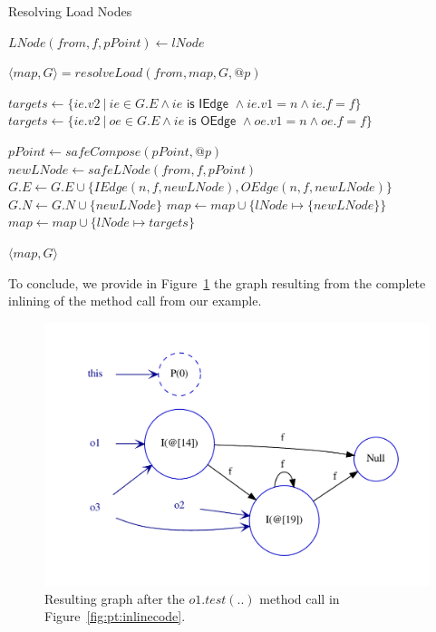 \begin{algorithm}
\caption{Resolving Load Nodes}\label{algo:pt:resload}
\begin{algorithmic}[1]

    \State $LNode(from, f, pPoint) \gets lNode$

        \State $\langle map, G \rangle = resolveLoad(from, map, G, @p)$
    \EndIf

        \State $targets \gets \{ ie.v2 ~|~ ie \in G.E \land ie \textsf{ is IEdge } \land ie.v1 = n \land ie.f = f \}$
            \State $targets \gets \{ ie.v2 ~|~ oe \in G.E \land ie \textsf{ is OEdge } \land oe.v1 = n \land oe.f = f \}$
        \EndIf

            \State $pPoint \gets safeCompose(pPoint, @p)$
            \State $newLNode \gets safeLNode(from, f, pPoint)$
            \State $G.E \gets G.E \cup \{ IEdge(n, f, newLNode), OEdge(n, f, newLNode) \}$
            \State $G.N \gets G.N \cup \{ newLNode \}$
            \State $map \gets map \cup \{ lNode \mapsto \{ newLNode \} \}$
        \Else
            \State $map \gets map \cup \{ lNode \mapsto targets \}$
        \EndIf
    \EndFor

    \State \Return $\langle map, G \rangle$
\EndFunction
\end{algorithmic}
\end{algorithm}

To conclude, we provide in Figure~\ref{fig:pt:inline1result} the graph
resulting from the complete inlining of the method call from our example.
\begin{figure}
    \centering
    \includegraphics[scale=0.7]{images/pt_inline1result}
    \caption{Resulting graph after the $o1.test(..)$ method call in Figure~\ref{fig:pt:inlinecode}.}
    \label{fig:pt:inline1result}
\end{figure}

